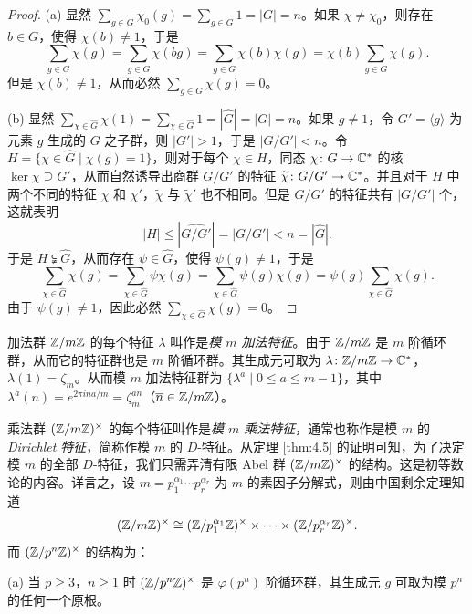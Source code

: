 \begin{proof}
(a) 显然 $\sum_{g\in G}\chi_0(g)=\sum_{g\in G}1=|G|=n$。如果 $\chi\neq\chi_0$，则存在 $b\in G$，使得 $\chi(b)\neq 1$，于是
\[
  \sum_{g\in G}\chi(g)=\sum_{g\in G}\chi(bg)=\sum_{g\in G}\chi(b)\chi(g)=\chi(b)\sum_{g\in G}\chi(g).
\]
但是 $\chi(b)\neq 1$，从而必然 $\sum_{g\in G}\chi(g)=0$。

(b) 显然 $\sum_{\chi\in\widehat{G}}\chi(1)=\sum_{\chi\in\widehat{G}}1=|\widehat{G}|=|G|=n$。如果 $g\neq 1$，令 $G'=\langle g\rangle$ 为元素 $g$ 生成的 $G$ 之子群，则 $|G'|>1$，于是 $|G/G'|<n$。令 $H=\{\chi\in\widehat{G}\mid\chi(g)=1\}$，则对于每个 $\chi\in H$，同态 $\chi\colon G\to\mathbb{C}^*$ 的核 $\ker\chi\supseteq G'$，从而自然诱导出商群 $G/G'$ 的特征 $\widetilde{\chi}\colon G/G'\to\mathbb{C}^*$。并且对于 $H$ 中两个不同的特征 $\chi$ 和 $\chi'$，$\widetilde{\chi}$ 与 $\widetilde{\chi}'$ 也不相同。但是 $G/G'$ 的特征共有 $|G/G'|$ 个，这就表明
\[
  |H|\leqslant|\widehat{G/G'}|=|G/G'|<n=|\widehat{G}|.
\]
于是 $H\subsetneqq\widehat{G}$，从而存在 $\psi\in\widehat{G}$，使得 $\psi(g)\neq 1$，于是
\[
  \sum_{\chi\in\widehat{G}}\chi(g)=\sum_{\chi\in\widehat{G}}\psi\chi(g)
  =\sum_{\chi\in\widehat{G}}\psi(g)\chi(g)=\psi(g)\sum_{\chi\in\widehat{G}}\chi(g).
\]
由于 $\psi(g)\neq 1$，因此必然 $\sum_{\chi\in\widehat{G}}\chi(g)=0$。
\end{proof}

\begin{definition}\label{def:ch4-4}
加法群 $\mathbb{Z}/m\mathbb{Z}$ 的每个特征 $\lambda$ 叫作是\emph{模 $m$ 加法特征}。由于 $\mathbb{Z}/m\mathbb{Z}$ 是 $m$ 阶循环群，从而它的特征群也是 $m$ 阶循环群。其生成元可取为 $\lambda\colon\mathbb{Z}/m\mathbb{Z}\to\mathbb{C}^*$，$\lambda(1)=\zeta_m$。从而模 $m$ 加法特征群为 $\{\lambda^a\mid 0\leqslant a\leqslant m-1\}$，其中 $\lambda^a(n)=e^{2\pi ina/m}=\zeta_m^{an}$（$\overline{n}\in\mathbb{Z}/m\mathbb{Z}$）。
\end{definition}

乘法群 $(\mathbb{Z}/m\mathbb{Z})^{\times}$ 的每个特征叫作是\emph{模 $m$ 乘法特征}，通常也称作是模 $m$ 的 \emph{Dirichlet 特征}，简称作模 $m$ 的 $D$-特征。从定理 \ref{thm:4.5} 的证明可知，为了决定模 $m$ 的全部 $D$-特征，我们只需弄清有限 Abel 群 $(\mathbb{Z}/m\mathbb{Z})^{\times}$ 的结构。这是初等数论的内容。详言之，设 $m=p_1^{\alpha_1}\cdots p_r^{\alpha_r}$ 为 $m$ 的素因子分解式，则由中国剩余定理知道
\[
  (\mathbb{Z}/m\mathbb{Z})^{\times}\cong(\mathbb{Z}/p_1^{\alpha_1}\mathbb{Z})^{\times}\times\cdots\times(\mathbb{Z}/p_r^{\alpha_r}\mathbb{Z})^{\times}.
\]
而 $(\mathbb{Z}/p^n\mathbb{Z})^{\times}$ 的结构为：

(a) 当 $p\geqslant 3$，$n\geqslant 1$ 时 $(\mathbb{Z}/p^n\mathbb{Z})^{\times}$ 是 $\varphi(p^n)$ 阶循环群，其生成元 $g$ 可取为模 $p^n$ 的任何一个原根。

